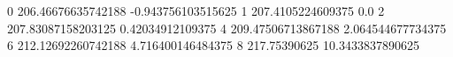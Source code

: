 0 206.46676635742188 -0.943756103515625
1 207.4105224609375 0.0
2 207.83087158203125 0.42034912109375
4 209.47506713867188 2.064544677734375
6 212.12692260742188 4.716400146484375
8 217.75390625 10.3433837890625
